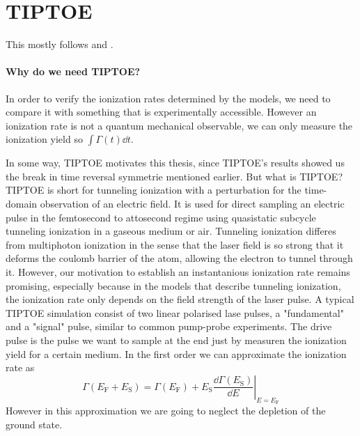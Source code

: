 \section{TIPTOE}
This mostly follows \cite{Park:18} and \cite{manorammasterthesis}.
\paragraph{Why do we need TIPTOE?} 
In order to verify the ionization rates determined by the models, we need to compare it with something that is experimentally accessible.
However an ionization rate is not a quantum mechanical observable, we can only measure the ionization yield so $\int \Gamma(t) \dd t$.

In some way, TIPTOE motivates this thesis, since TIPTOE's results showed us the break in time reversal symmetrie mentioned earlier.
But what is TIPTOE? TIPTOE \cite{Park:18} is short for tunneling ionization with a perturbation for the time-domain observation of an electric field. 
It is used for direct sampling an electric pulse in the femtosecond to attosecond regime using quasistatic subcycle tunneling ionization in a gaseous medium or air.
Tunneling ionization differes from multiphoton ionization in the sense that the laser field is so strong that it deforms the coulomb barrier of the atom, allowing the electron to tunnel through it.
However, our motivation to establish an instantanious ionization rate remains promising, especially because in the models that describe tunneling ionization, the ionization rate only depends on the field strength of the laser pulse.
A typical TIPTOE simulation consist of two linear polarised lase pulses, a "fundamental" and a "signal" pulse, similar to common pump-probe experiments. 
The drive pulse is the pulse we want to sample at the end just by measuren the ionization yield for a certain medium.
In the first order we can approximate the ionization rate as
\begin{equation*}
    \Gamma(E_{\mathrm{F}}+E_{\mathrm{S}})=\Gamma(E_{\mathrm{F}})+\left.E_{\mathrm{S}}\frac{\dd \Gamma(E_{\mathrm{S}})}{\dd E}\right|_{E=E_{\mathrm{F}}}
\end{equation*}
However in this approximation we are going to neglect the depletion of the ground state. 
